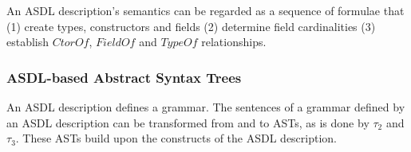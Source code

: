 \noindent
An ASDL description's semantics can be regarded as a sequence of formulae that
(1) create types, constructors and fields (2) determine field cardinalities 
(3) establish \(CtorOf\), \(FieldOf\) and \(TypeOf\) relationships.
\fi

\subsubsection{ASDL-based Abstract Syntax Trees}

An ASDL description defines a grammar. The sentences of a grammar defined by
an ASDL description can be transformed from and to ASTs, as is done by
\(\tau_{2}\) and \(\tau_{3}\). These ASTs build upon the constructs of the
ASDL description.

\noindent

\iffalse
Let's introduce the following new predicates:

\begin{align*}
RootType(t)   &= \text{"t is the root type"} \\
ValueOf(x, f) &= \text{"x is a value of f"} \\
TokenOf(x, t) &= \text{"x is a token of t"}
\end{align*}

\noindent
The following formulae state the properties of these newly introduced constructs:

\begingroup
\allowdisplaybreaks
\vspace{-.5cm}
\begin{gather*}
\forall t(RootType(t) \Rightarrow Type(t)) \\
\exists! t(RootType(t)) \\
\forall t(Prim(t) \Rightarrow \exists x(TokenOf(x, t))) \\
\forall t(Comp(t) \Rightarrow \nexists x(TokenOf(x, t))) \\
\forall f(SinField(f) \Rightarrow \exists! x(ValueOf(x, f))) \\
\forall f(OptField(f) \Rightarrow \forall x \forall y(ValueOf(x, f) 
\land ValueOf(y, f) \Rightarrow x = y)) \\
\forall x \forall f(ValueOf(x, f) \Rightarrow Field(f)) \\
\forall x \forall f \forall t(ValueOf(x, f) \land
TypeOf(t, f) \land Comp(t) \Rightarrow Ctor(x) \land CtorOf(c, t)) \\
\forall x \forall f \forall t(ValueOf(x, f) \land TypeOf(t, f)
\land Prim(t) \Rightarrow TokenOf(x, t)) \\
\forall x \forall t(TokenOf(x, t) \Rightarrow Type(t))
\end{gather*}
\endgroup
\fi

